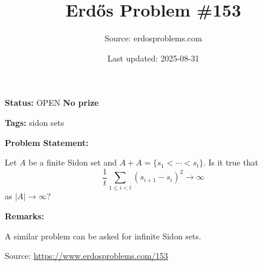 \documentclass{article}
\title{Erd\H{o}s Problem \#153}
\date{Last updated: 2025-08-31}
\author{Source: erdosproblems.com}
\begin{document}
\maketitle

\noindent\textbf{Status:} OPEN \quad \textbf{No prize}

\noindent\textbf{Tags:} sidon sets

\medskip
\noindent\textbf{Problem Statement:}

Let $A$ be a finite Sidon set and $A+A=\{s_1<\cdots<s_t\}$. Is it true that\[\frac{1}{t}\sum_{1\leq i<t}(s_{i+1}-s_i)^2 \to \infty\]as $\lvert A\rvert\to \infty$?

\bigskip
\noindent\textbf{Remarks:}

A similar problem can be asked for infinite Sidon sets.

\bigskip
\noindent\small{Source: \url{https://www.erdosproblems.com/153}}
\end{document}
